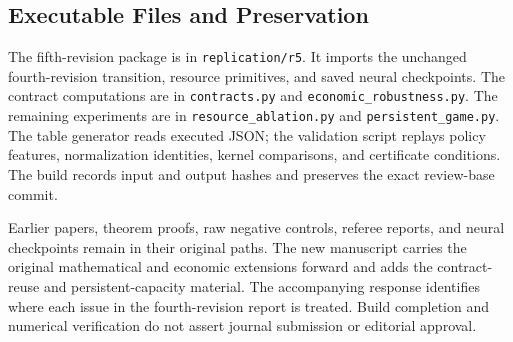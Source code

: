 \subsection{Executable Files and Preservation}
The fifth-revision package is in \texttt{replication/r5}. It imports the unchanged fourth-revision transition, resource primitives, and saved neural checkpoints. The contract computations are in \texttt{contracts.py} and \texttt{economic\_robustness.py}. The remaining experiments are in \texttt{resource\_ablation.py} and \texttt{persistent\_game.py}. The table generator reads executed JSON; the validation script replays policy features, normalization identities, kernel comparisons, and certificate conditions. The build records input and output hashes and preserves the exact review-base commit.

Earlier papers, theorem proofs, raw negative controls, referee reports, and neural checkpoints remain in their original paths. The new manuscript carries the original mathematical and economic extensions forward and adds the contract-reuse and persistent-capacity material. The accompanying response identifies where each issue in the fourth-revision report is treated. Build completion and numerical verification do not assert journal submission or editorial approval.
